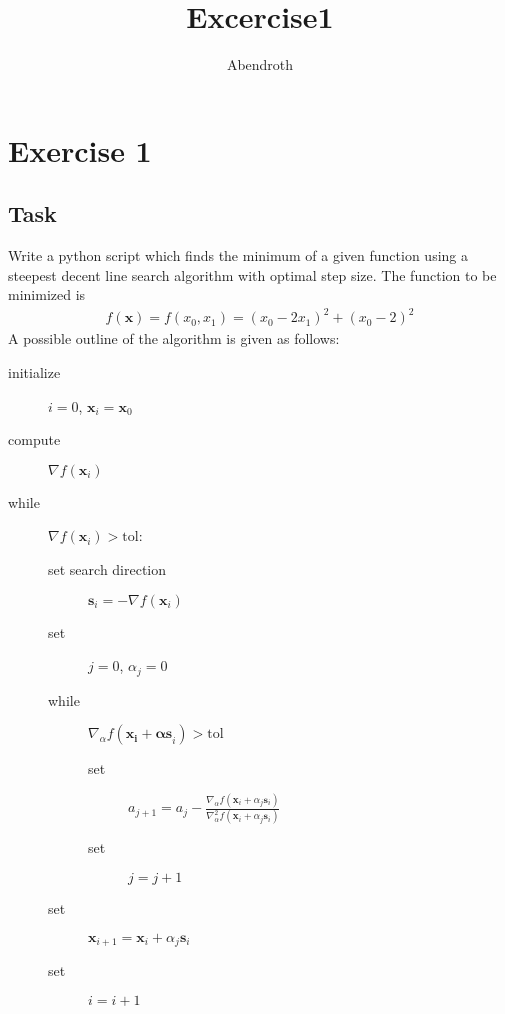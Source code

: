 \documentclass[11pt,a4paper]{article}
\author{Abendroth}
\title{Excercise1}
\begin{document}
\section*{Exercise 1}
\subsection*{Task}
Write a python script which finds the minimum of a given function using a steepest decent line search algorithm with optimal step size. The function to be minimized is
\begin{align*}
f(\mathbf{x})=f(x_0,x_1)=(x_0-2 x_1)^2 + (x_0-2)^2
\end{align*}
A possible outline of the algorithm is given as follows:
\begin{description}
 \item[initialize]{$i=0$, $\mathbf{x}_i=\mathbf{x}_0$}
 \item[compute]{$\nabla f(\mathbf{x}_i)$}
 \item[while]{$\nabla f(\mathbf{x}_i) > \mathrm{tol}$:}
 \begin{description}
  \item[set search direction]{$\mathbf{s}_i=-\nabla f(\mathbf{x}_i)$}
  \item[set]{$j=0$, $\alpha_j=0$}
  \item[while]{$\nabla_\alpha f(\mathbf{\mathbf{x}_i+ \alpha \mathbf{s}}_i) > \mathrm{tol}$}
  \begin{description}
   \item[set]{$a_{j+1}=a_j- \frac{\nabla_{\alpha} f(\mathbf{x}_i + \alpha_j \mathbf{s}_i)}{\nabla^2_{\alpha} f(\mathbf{x}_i+ \alpha_j \mathbf{s}_i)}$}
   \item[set]{$j=j+1$}
  \end{description}
  \item[set]{$\mathbf{x}_{i+1}=\mathbf{x}_i+\alpha_j \mathbf{s}_i$}
  \item[set]{$i=i+1$}
 \end{description}  
\end{description}
\end{document}
